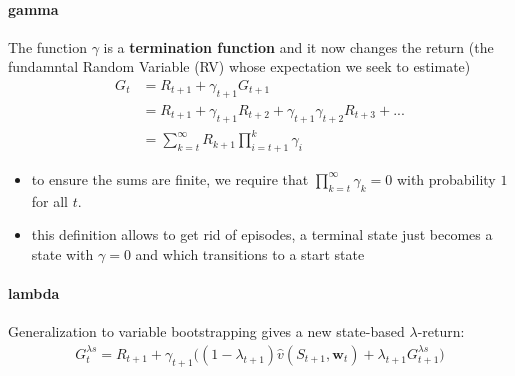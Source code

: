 \documentclass[sutton_barto_notes.tex]{subfiles}
\begin{document}
\paragraph{gamma}
 The function $\gamma$ is a \textbf{termination function} and it now changes the return (the fundamntal Random Variable (RV) whose expectation we seek to estimate) 
\begin{align}
G_t & = R_{t+1} + \gamma_{t+1} G_{t+1}\\
 & = R_{t+1} + \gamma_{t+1} R_{t+2} + \gamma_{t+1} \gamma_{t+2} R_{t+3} + ...\\
 & = \sum_{k=t}^{\infty} R_{k+1} \prod_{i=t+1}^k \gamma_i \label{eq:12.17}\tag{12.17}
\end{align} 
\begin{itemize}
\item to ensure the sums are finite, we require that $\prod_{k=t}^{\infty} \gamma_k = 0$ with probability $1$ for all $t$. 
\item this definition allows to get rid of episodes, a terminal state just becomes a state with $\gamma = 0$ and which transitions to a start state 
\end{itemize}

\paragraph{lambda}
 Generalization to variable bootstrapping gives a new state-based $\lambda$-return: 
\begin{align}
G_t^{\lambda s} = R_{t+1} + \gamma_{t+1} \big( (1 - \lambda_{t+1}) \hat{v}(S_{t+1}, \mathbf{w}_{t}) + \lambda_{t+1} G_{t+1}^{\lambda s}\big) \label{eq:12.18}\tag{12.18}
\end{align}
\end{document}
